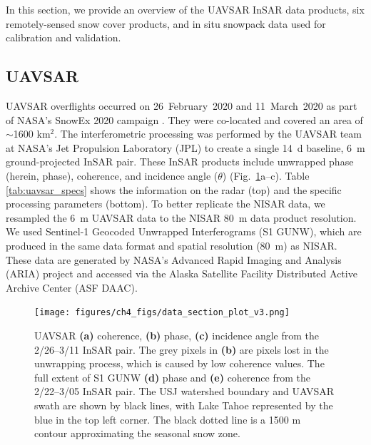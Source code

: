 In this section, we provide an overview of the UAVSAR InSAR data products, six remotely-sensed snow cover products, and in situ snowpack data used for calibration and validation.

\hypertarget{ch4-methods-1}{\subsection{UAVSAR}\label{ch4-methods-1}}

UAVSAR overflights occurred on 26~February~2020 and 11~March~2020 as part of NASA's SnowEx 2020 campaign \citep{marshallNASASnowEx20202019}. They were co-located and covered an area of $\sim$1600 km$^{2}$. The interferometric processing was performed by the UAVSAR team at NASA's Jet Propulsion Laboratory (JPL) to create a single 14~d baseline, 6~m ground-projected InSAR pair. These InSAR products include unwrapped phase (herein, phase), coherence, and incidence angle ($\theta$) (Fig.~\ref{fig:uavsar_cor_inc_phase_plot}a--c). Table \ref{tab:uavsar_specs} shows the information on the radar (top) and the specific processing parameters (bottom). To better replicate the NISAR data, we resampled the 6~m UAVSAR data to the NISAR 80~m data product resolution. We used Sentinel-1 Geocoded Unwrapped Interferograms (S1 GUNW), which are produced in the same data format and spatial resolution (80~m) as NISAR. These data are generated by NASA's Advanced Rapid Imaging and Analysis (ARIA) \citep{bekaertDevelopmentDisseminationStandardized2019,buzzangaSustainedMonitoringSubsidence2020} project and accessed via the Alaska Satellite Facility Distributed Active Archive Center (ASF DAAC).

\begin{figure}[ht]
\texttt{[image: figures/ch4\_figs/data\_section\_plot\_v3.png]}
\centering
\caption{UAVSAR \textbf{(a)} coherence, \textbf{(b)} phase, \textbf{(c)} incidence angle from the 2/26--3/11 InSAR pair. The grey pixels in \textbf{(b)} are pixels lost in the unwrapping process, which is caused by low coherence values. The full extent of S1 GUNW \textbf{(d)} phase and \textbf{(e)} coherence from the 2/22--3/05 InSAR pair. The USJ watershed boundary and UAVSAR swath are shown by black lines, with Lake Tahoe represented by the blue in the top left corner. The black dotted line is a 1500 m contour approximating the seasonal snow zone.}
\label{fig:uavsar_cor_inc_phase_plot}
\end{figure}


